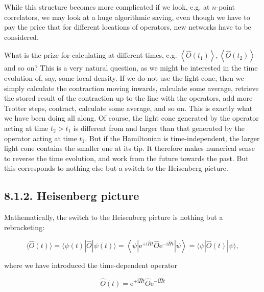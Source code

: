 \documentclass[12pt]{article}
\begin{document}
While this structure becomes more complicated if we look, e.g. at $n$-point correlators, we may look at a huge algorithmic saving, even though we have to pay the price that for different locations of operators, new networks have to be considered.

What is the prize for calculating at different times, e.g. $\left\langle\hat{O}\left(t_{1}\right)\right\rangle,\left\langle\hat{O}\left(t_{2}\right)\right\rangle$ and so on? This is a very natural question, as we might be interested in the time evolution of, say, some local density. If we do not use the light cone, then we simply calculate the contraction moving inwards, calculate some average, retrieve the stored result of the contraction up to the line with the operators, add more Trotter steps, contract, calculate some average, and so on. This is exactly what we have been doing all along. Of course, the light cone generated by the operator acting at time $t_{2}>t_{1}$ is different from and larger than that generated by the operator acting at time $t_{1}$. But if the Hamiltonian is time-independent, the larger light cone contains the smaller one at its tip. It therefore makes numerical sense to reverse the time evolution, and work from the future towards the past. But this corresponds to nothing else but a switch to the Heisenberg picture.

\subsection*{8.1.2. Heisenberg picture}
Mathematically, the switch to the Heisenberg picture is nothing but a rebracketing:


\begin{equation*}
\langle\hat{O}(t)\rangle=\langle\psi(t)|\hat{O}| \psi(t)\rangle=\left\langle\psi\left|\mathrm{e}^{+\mathrm{i} \hat{H} t} \hat{O} \mathrm{e}^{-\mathrm{i} \hat{H} t}\right| \psi\right\rangle=\langle\psi|\hat{O}(t)| \psi\rangle, \tag{281}
\end{equation*}


where we have introduced the time-dependent operator


\begin{equation*}
\hat{O}(t)=\mathrm{e}^{+\mathrm{i} \hat{H} t} \hat{O} \mathrm{e}^{-\mathrm{i} \hat{H} t} \tag{282}
\end{equation*}
\end{document}
